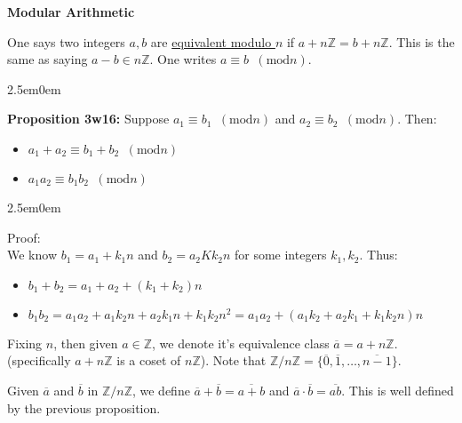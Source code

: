 \documentclass{book}
\newcommand{\hTwo}{%
\color{MidnightBlue}%
   \fontsize{13}{15}\selectfont%
}
\newcommand{\hThree}{%
   \color{PineGreen!85!Orange}
   \fontsize{12}{14}\selectfont%
}
\newenvironment{myIndent}{%
   \begin{adjustwidth}{2.5em}{0em}%
}{%
   \end{adjustwidth}%
}
\newcommand{\udefine}[1]{{%
   \setulcolor{Red}%
   \setul{0.14em}{0.07em}%
   \ul{#1}%
}}
\newcommand{\blab}[1]{\textbf{#1}}
\newcommand{\mMod}[1]{\phantom{a}(\mathrel{\mathrm{mod}} #1)}
\newcommand{\retTwo}{\hfill\bigbreak}
\begin{document}
\blab{Modular Arithmetic}\retTwo

One says two integers $a, b$ are \udefine{equivalent modulo $n$} if $a + n\mathbb{Z} = b + n\mathbb{Z}$. This is the same as saying $a - b \in n\mathbb{Z}$. One writes $a \equiv b \mMod{n}$.

\begin{myIndent}\hTwo
	\blab{Proposition 3w16:} Suppose $a_1 \equiv b_1 \mMod{n}$ and $a_2 \equiv b_2 \mMod{n}$. Then:
	
	\begin{itemize}
		\item $a_1 + a_2 \equiv b_1 + b_2 \mMod{n}$
		\item $a_1a_2 \equiv b_1b_2 \mMod{n}$
	\end{itemize}

	\begin{myIndent}\hThree
			Proof:\\
			We know $b_1 = a_1 + k_1n$ and $b_2 = a_2 K k_2n$ for some integers $k_1, k_2$. Thus:\fontsize{11.5}{13.5}\selectfont
			\begin{itemize}
				\item $b_1 + b_2 = a_1 + a_2 + (k_1 + k_2)n$
				\item $b_1b_2 = a_1a_2 + a_1k_2n + a_2k_1n + k_1k_2n^2 = a_1a_2 + (a_1k_2 + a_2k_1 + k_1k_2n)n$\retTwo
			\end{itemize}
	\end{myIndent}
\end{myIndent}

Fixing $n$, then given $a \in \mathbb{Z}$, we denote it's equivalence class $\overline{a} = a + n\mathbb{Z}$.\\ (specifically $a + n\mathbb{Z}$ is a coset of $n\mathbb{Z}$). Note that $\mathbb{Z}/n\mathbb{Z} = \{\overline{0}, \overline{1}, \ldots, \overline{n-1}\}$.\retTwo

Given $\overline{a}$ and $\overline{b}$ in $\mathbb{Z}/n\mathbb{Z}$, we define $\overline{a} + \overline{b} = \overline{a + b}$ and $\overline{a} \cdot \overline{b} = \overline{ab}$. This is well defined by the previous proposition.\retTwo
\end{document}
